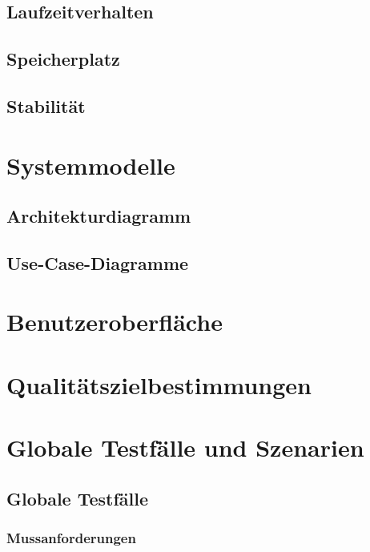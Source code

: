 \documentclass[a4paper,12pt]{article}
\begin{document}
\subsection{Laufzeitverhalten}
\subsection{Speicherplatz}
\subsection{Stabilität}

\section{Systemmodelle}
  \subsection{Architekturdiagramm}
  \subsection{Use-Case-Diagramme}
\begin{center}
\end{center}
\section{Benutzeroberfläche}
\section{Qualitätszielbestimmungen}
\section{Globale Testfälle und Szenarien}
  \subsection{Globale Testfälle}
  \subsubsection{Mussanforderungen}
\end{document}
